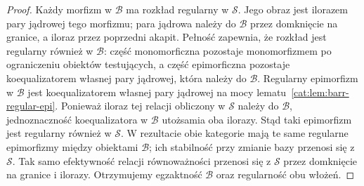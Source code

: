 \begin{proof}
Każdy morfizm w $\mathcal B$ ma rozkład regularny w $\mathcal S$. Jego obraz jest ilorazem pary jądrowej tego morfizmu; para jądrowa należy do $\mathcal B$ przez domknięcie na granice, a iloraz przez poprzedni akapit. Pełność zapewnia, że rozkład jest regularny również w $\mathcal B$: część monomorficzna pozostaje monomorfizmem po ograniczeniu obiektów testujących, a część epimorficzna pozostaje koequalizatorem własnej pary jądrowej, która należy do $\mathcal B$. Regularny epimorfizm w $\mathcal B$ jest koequalizatorem własnej pary jądrowej na mocy lematu~\ref{cat:lem:barr-regular-epi}. Ponieważ iloraz tej relacji obliczony w $\mathcal S$ należy do $\mathcal B$, jednoznaczność koequalizatora w $\mathcal B$ utożsamia oba ilorazy. Stąd taki epimorfizm jest regularny również w $\mathcal S$. W rezultacie obie kategorie mają te same regularne epimorfizmy między obiektami $\mathcal B$; ich stabilność przy zmianie bazy przenosi się z $\mathcal S$. Tak samo efektywność relacji równoważności przenosi się z $\mathcal S$ przez domknięcie na granice i ilorazy. Otrzymujemy egzaktność $\mathcal B$ oraz regularność obu włożeń.
\end{proof}

